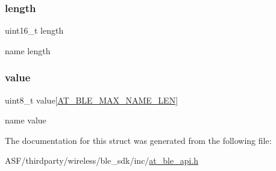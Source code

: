 \subsubsection{\texorpdfstring{length}{length}}
{\footnotesize\ttfamily uint16\+\_\+t length}



name length 

\mbox{\label{structat__ble__dev__info_1_1dev__info_1_1device__name_a475c040a11281f79de92f073c7521dc5}} 
\subsubsection{\texorpdfstring{value}{value}}
{\footnotesize\ttfamily uint8\+\_\+t value\mbox{[}\mbox{\hyperlink{at__ble__api_8h_ade8ce3f882f05dd2b9e5da4c2d6142ba}{A\+T\+\_\+\+B\+L\+E\+\_\+\+M\+A\+X\+\_\+\+N\+A\+M\+E\+\_\+\+L\+EN}}\mbox{]}}



name value 



The documentation for this struct was generated from the following file\+:\begin{DoxyCompactItemize}
\item 
A\+S\+F/thirdparty/wireless/ble\+\_\+sdk/inc/\mbox{\hyperlink{at__ble__api_8h}{at\+\_\+ble\+\_\+api.\+h}}\end{DoxyCompactItemize}
